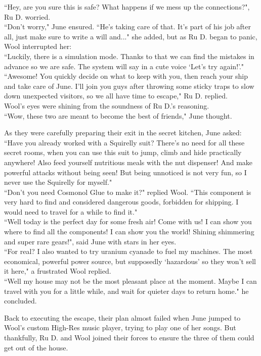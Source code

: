 ``Hey, are you sure this is safe? What happens if we mess up the connections?", Ru D. worried.\\
``Don't worry," June ensured. ``He's taking care of that. It's part of his job after all, just make sure to write a will and..." she added, but as Ru D. began to panic, Wool interrupted her:\\
``Luckily, there is a simulation mode. Thanks to that we can find the mistakes in advance so we are safe. The system will say in a cute voice `Let's try again!'."\\
``Awesome! You quickly decide on what to keep with you, then reach your ship and take care of June. I'll join you guys after throwing some sticky traps to slow down unexpected visitors, so we all have time to escape,"  Ru D. replied.\\
Wool's eyes were shining from the soundness of Ru D.'s reasoning. \\
``Wow, these two are meant to become the best of friends," June thought.


As they were carefully preparing their exit in the secret kitchen, June asked:\\
``Have you already worked with a Squirelly suit? There’s no need for all these secret rooms, when you can use this suit to jump, climb and hide practically anywhere! Also feed yourself nutritious meals with the nut dispenser! And make powerful attacks without being seen! But being unnoticed is not very fun, so I never use the Squirelly for myself."\\
``Don’t you need Cosmonol Glue to make it?" replied Wool. ``This component is very hard to find and considered dangerous goods, forbidden for shipping. I would need to travel for a while to find it."\\
``Well today is the perfect day for some fresh air! Come with us! I can show you where to find all the components! I can show you the world! Shining shimmering and super rare gears!", said June with stars in her eyes.\\
``For real? I also wanted to try uranium cyanade to fuel my machines. The most economical, powerful power source, but supposedly ‘hazardous’ so they won’t sell it here," a frustrated Wool replied.\\
``Well my house may not be the most pleasant place at the moment. Maybe I can travel with you for a little while, and wait for quieter days to return home." he concluded.


Back to executing the escape, their plan almost failed when June jumped to Wool's custom High-Res music player, trying to play one of her songs. But thankfully, Ru D. and Wool joined their forces to ensure the three of them could get out of the house.


